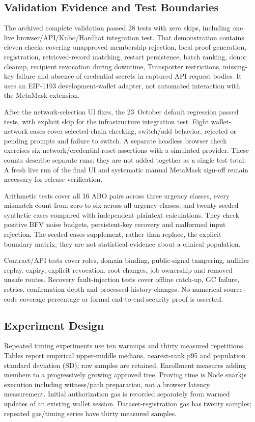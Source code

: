 \documentclass[10pt,twocolumn,a4paper]{article}
\begin{document}
\subsection{Validation Evidence and Test Boundaries}
The archived complete validation passed 28 tests with zero skips, including one
live browser/API/Kubo/Hardhat integration test. That demonstration contains eleven
checks covering unapproved membership rejection, local proof generation,
registration, retrieved-record matching, restart persistence, batch ranking, donor
cleanup, recipient revocation during downtime, Transporter restrictions,
missing-key failure and absence of credential secrets in captured API request bodies.
It uses an EIP-1193 development-wallet adapter, not automated interaction with the
MetaMask extension.

After the network-selection UI fixes, the 23~October default regression passed
\CurrentTestsPassed{} tests, with \CurrentTestsSkipped{} explicit skip for the
infrastructure integration test. Eight wallet-network cases cover selected-chain
checking, switch/add behavior, rejected or pending prompts and failure to switch.
A separate headless browser check exercises six network/credential-reset assertions
with a simulated provider. These counts describe separate runs; they are not added
together as a single test total. A fresh live run of the final UI and systematic
manual MetaMask sign-off remain necessary for release verification.

Arithmetic tests cover all 16 ABO pairs across three urgency classes, every
mismatch count from zero to six across all urgency classes, and twenty seeded
synthetic cases compared with independent plaintext calculations. They check
positive BFV noise budgets, persistent-key recovery and malformed input rejection.
The seeded cases supplement, rather than replace, the explicit boundary matrix;
they are not statistical evidence about a clinical population.

Contract/API tests cover roles, domain binding, public-signal tampering, nullifier
replay, expiry, explicit revocation, root changes, job ownership and removed unsafe
routes. Recovery fault-injection tests cover offline catch-up, GC failure, retries,
confirmation depth and processed-history changes. No numerical source-code coverage
percentage or formal end-to-end security proof is asserted.

\subsection{Experiment Design}
Repeated timing experiments use ten warmups and thirty measured repetitions.
Tables report empirical upper-middle medians, nearest-rank p95 and population
standard deviation (SD); raw samples are retained. Enrollment measures adding
members to a progressively growing approved tree. Proving time is Node snarkjs
execution including witness/path preparation, not a browser latency measurement.
Initial authorization gas is recorded separately from warmed updates of an existing
wallet session. Dataset-registration gas has twenty samples; repeated gas/timing
series have thirty measured samples.
\end{document}

